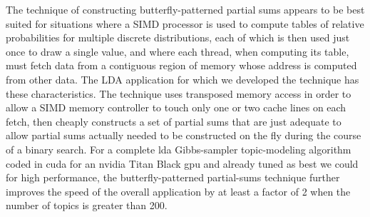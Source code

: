 \documentclass[10pt,nohyperref]{sigplanconf}
\begin{document}
The technique of constructing butterfly-patterned partial sums appears to be best suited
for situations where a SIMD processor is used to compute tables of relative probabilities for multiple discrete distributions,
each of which is then used just once to draw a single value, and where each thread, when computing its table,
must fetch data from a contiguous region of memory whose address is computed from other data.
The LDA application for which we developed the technique has these characteristics.
The technique uses transposed memory access in order to allow a SIMD memory controller
to touch only one or two cache lines on each fetch, then cheaply constructs a set of partial sums
that are just adequate to allow partial sums actually needed to be constructed on the fly
during the course of a binary search.
For a complete {\sc lda} Gibbs-sampler topic-modeling algorithm coded in {\sc cuda} for an {\sc nvidia}
Titan Black {\sc gpu} and already tuned as best we could for high performance, the butterfly-patterned
partial-sums technique further improves the speed of the overall application by at least a factor of 2
when the number of topics is greater than 200.








\end{document}
